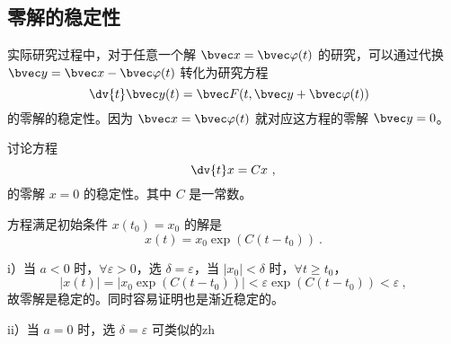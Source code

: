 \subsection{零解的稳定性}
实际研究过程中，对于任意一个解 $\bvec x = \bvec \varphi(t)$ 的研究，可以通过代换 $\bvec y = \bvec x - \bvec \varphi(t)$ 转化为研究方程 
\begin{equation}
\dv{t} \bvec y(t) = \bvec F(t, \bvec y + \bvec \varphi(t)) ~~
\end{equation}
的零解的稳定性。因为 $\bvec x = \bvec \varphi(t)$ 就对应这方程的零解 $\bvec y= 0$。

\begin{example}{}
讨论方程 
\begin{equation}
\dv{t} x = Cx ~,
\end{equation}
的零解 $x = 0$ 的稳定性。其中 $C$ 是一常数。
\end{example}

方程满足初始条件 $x(t_0) = x_0$ 的解是 
\begin{equation}
x(t) = x_0 \exp(C (t - t_0)) ~.
\end{equation}

i）当 $a<0$ 时，$\forall \varepsilon > 0$，选 $\delta = \varepsilon$，当 $|x_0| < \delta$ 时，$\forall t \ge t_0$，
\begin{equation}
|x(t)| = |x_0 \exp(C (t-t_0))| < \varepsilon \exp(C(t-t_0)) < \varepsilon ~,
\end{equation}
故零解是稳定的。同时容易证明也是渐近稳定的。

ii）当 $a=0$ 时，选 $\delta = \varepsilon$ 可类似的zh
